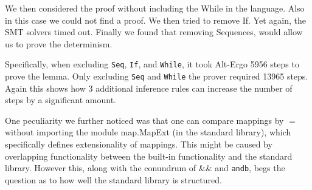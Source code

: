 We then considered the proof without including the While in the language. Also in this case we could not find a proof. We then tried to remove If. Yet again, the SMT solvers timed out. Finally we found that removing Sequences, would allow us to prove the determinism.

Specifically, when excluding \texttt{Seq}, \texttt{If}, and \texttt{While}, it took Alt-Ergo 5956 steps to prove the lemma.
Only excluding \texttt{Seq} and \texttt{While} the prover required 13965 steps. Again this shows how 3 additional inference rules
can increase the number of steps by a significant amount.

One peculiarity we further noticed was that one can compare mappings by $=$ without importing the module map.MapExt (in the standard library), which specifically defines extensionality of mappings.
This might be caused by overlapping functionality between the built-in functionality and
the standard library.
However this, along with the conundrum of \&\& and \texttt{andb}, begs the question as to how well the
standard library is structured.
